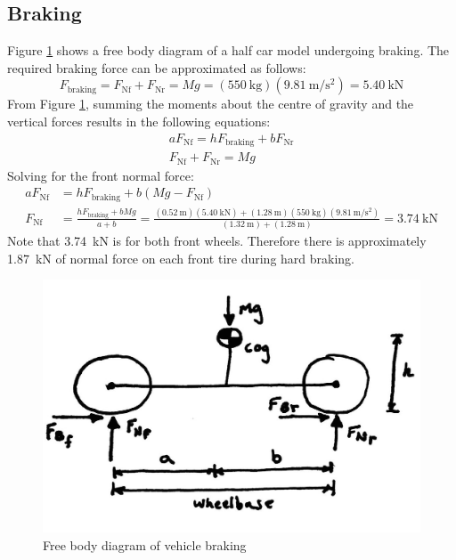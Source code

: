 \documentclass[10pt]{article}
\begin{document}
\subsection{Braking}
Figure \ref{fig:braking-fbd} shows a free body diagram of a half car model undergoing braking. The required braking force can be approximated as follows: 
\begin{equation}
F_\mathrm{braking} = F_\mathrm{Nf} + F_\mathrm{Nr} = Mg = (\SI{550}{\kilo\gram})(\SI{9.81}{\metre\per\second\squared}) = \SI{5.40}{\kilo\newton}
\end{equation}
From Figure \ref{fig:braking-fbd}, summing the moments about the centre of gravity and the vertical forces results in the following equations: 
\begin{gather}
aF_\mathrm{Nf} = hF_\mathrm{braking} + bF_\mathrm{Nr} \\
F_\mathrm{Nf} + F_\mathrm{Nr} = Mg
\end{gather}
Solving for the front normal force: 
\begin{equation}
\begin{split}
aF_\mathrm{Nf} &= hF_\mathrm{braking} + b(Mg - F_\mathrm{Nf})\\
F_\mathrm{Nf} &= \frac{hF_\mathrm{braking} + bMg}{a+b} = \frac{(\SI{0.52}{\metre})(\SI{5.40}{\kilo\newton})+(\SI{1.28}{\metre})(\SI{550}{\kilo\gram})(\SI{9.81}{\metre\per\second\squared})}{(\SI{1.32}{\metre})+(\SI{1.28}{\metre})} = \SI{3.74}{\kilo\newton}
\end{split}
\end{equation}
Note that \SI{3.74}{\kilo\newton} is for both front wheels. Therefore there is approximately \SI{1.87}{\kilo\newton} of normal force on each front tire during hard braking. 

\begin{figure}
\centering
\includegraphics[width=.5\textwidth]{figures/braking-fbd}
\caption{Free body diagram of vehicle braking}
\label{fig:braking-fbd}
\end{figure}
\end{document}
